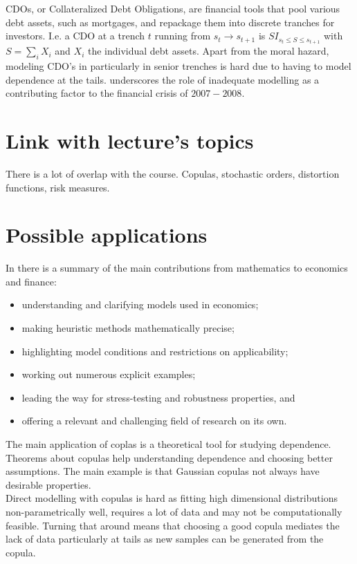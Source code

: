 \documentclass[a4paper,12pt]{article}
\begin{document}
CDOs, or Collateralized Debt Obligations, are financial tools that pool various debt assets,
such as mortgages, and repackage them into discrete tranches for investors.
I.e. a CDO at a trench $t$ running from $s_{t} \rightarrow s_{t+1}$ is
$S I_{s_{t} \le S \le s_{t+1}}$ with $S = \sum_{i} X_{i}$ and $X_{i}$ the
individual debt assets. Apart from the moral hazard,  modeling CDO's in particularly
in senior trenches is hard due to having to model dependence at the tails.
\cite{donnelly_devil_nodate} underscores the role of inadequate modelling as
a contributing factor to the financial crisis of $2007-2008$.

\section{Link with lecture's topics}

There is a lot of overlap with the course. Copulas, stochastic orders, distortion functions, risk measures.

\section{Possible applications}
In \cite{donnelly_devil_nodate} there is a summary of the main contributions
from mathematics to economics and finance:
\begin{itemize}
    \item  understanding and clarifying models used in economics;
    \item  making heuristic methods mathematically precise;
    \item  highlighting model conditions and restrictions on applicability;
    \item  working out numerous explicit examples;
    \item  leading the way for stress-testing and robustness properties, and
    \item  offering a relevant and challenging field of research on its own.
\end{itemize}

The main application of coplas is a theoretical tool for studying dependence.
Theorems about copulas help understanding dependence and choosing better assumptions.
The main example is that Gaussian copulas not always have desirable properties. \\

Direct modelling with copulas is hard as
fitting high dimensional distributions non-parametrically well, requires a lot of data and may not be
computationally feasible.  Turning that around means that choosing a good copula
mediates the lack of data particularly at tails as new samples can be generated from the copula. \\
\end{document}
